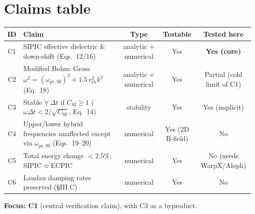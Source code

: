\documentclass[11pt]{article}
\begin{document}
\section{Claims table}
\begin{center}\small
\begin{tabular}{@{}clccc@{}}
\toprule
ID & Claim & Type & Testable & Tested here \\
\midrule
C1 & SIPIC effective dielectric \& down-shift (Eqs.~12/16) & analytic + numerical & Yes & \textbf{Yes (core)} \\
C2 & Modified Bohm--Gross $\omega^{2}=(\omega_{pe,\text{SI}})^{2}+1.5\,v_{th}^{2}k^{2}$ (Eq.~18) & analytic + numerical & Yes & Partial (cold limit of C1) \\
C3 & Stable $\forall\,\Delta t$ if $C_{\text{SI}}\ge 1$ ($\omega\Delta t < 2/\sqrt{C_{\text{SI}}}$, Eq.~14) & stability & Yes & Yes (implicit) \\
C4 & Upper/lower hybrid frequencies unaffected except via $\omega_{pe,\text{SI}}$ (Eqs.~19--20) & numerical & Yes (2D B-field) & No \\
C5 & Total energy change $<2.5\%$; SIPIC$\approx$ECPIC & numerical & Yes & No (needs WarpX/Aleph) \\
C6 & Landau damping rates preserved (\S III.C) & numerical & Yes & No \\
\bottomrule
\end{tabular}
\end{center}

\noindent\textbf{Focus: C1} (central verification claim), with C3 as a
byproduct.
\end{document}
